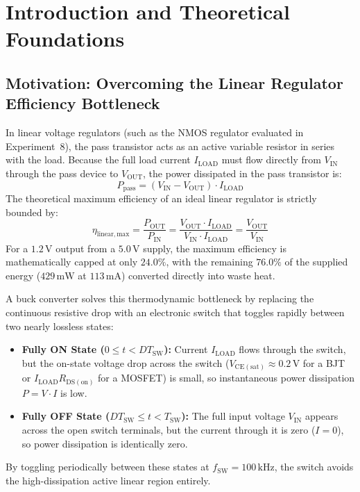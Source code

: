 \documentclass[11pt,a4paper]{article}
\begin{document}
\section{Introduction and Theoretical Foundations}

\subsection{Motivation: Overcoming the Linear Regulator Efficiency Bottleneck}
In linear voltage regulators (such as the NMOS regulator evaluated in Experiment~8), the pass transistor acts as an active variable resistor in series with the load. Because the full load current $I_{\mathrm{LOAD}}$ must flow directly from $V_{\mathrm{IN}}$ through the pass device to $V_{\mathrm{OUT}}$, the power dissipated in the pass transistor is:
\begin{equation}
    P_{\mathrm{pass}} = (V_{\mathrm{IN}} - V_{\mathrm{OUT}}) \cdot I_{\mathrm{LOAD}}
\end{equation}
The theoretical maximum efficiency of an ideal linear regulator is strictly bounded by:
\begin{equation}
    \eta_{\mathrm{linear,max}} = \frac{P_{\mathrm{OUT}}}{P_{\mathrm{IN}}} = \frac{V_{\mathrm{OUT}} \cdot I_{\mathrm{LOAD}}}{V_{\mathrm{IN}} \cdot I_{\mathrm{LOAD}}} = \frac{V_{\mathrm{OUT}}}{V_{\mathrm{IN}}}
\end{equation}
For a $1.2\,\mathrm{V}$ output from a $5.0\,\mathrm{V}$ supply, the maximum efficiency is mathematically capped at only $24.0\%$, with the remaining $76.0\%$ of the supplied energy ($429\,\mathrm{mW}$ at $113\,\mathrm{mA}$) converted directly into waste heat.

A buck converter solves this thermodynamic bottleneck by replacing the continuous resistive drop with an electronic switch that toggles rapidly between two nearly lossless states:
\begin{itemize}
    \item \textbf{Fully ON State ($0 \le t < D T_{\mathrm{SW}}$):} Current $I_{\mathrm{LOAD}}$ flows through the switch, but the on-state voltage drop across the switch ($V_{\mathrm{CE(sat)}} \approx 0.2\,\mathrm{V}$ for a BJT or $I_{\mathrm{LOAD}} R_{\mathrm{DS(on)}}$ for a MOSFET) is small, so instantaneous power dissipation $P = V \cdot I$ is low.
    \item \textbf{Fully OFF State ($D T_{\mathrm{SW}} \le t < T_{\mathrm{SW}}$):} The full input voltage $V_{\mathrm{IN}}$ appears across the open switch terminals, but the current through it is zero ($I = 0$), so power dissipation is identically zero.
\end{itemize}
By toggling periodically between these states at $f_{\mathrm{SW}} = 100\,\mathrm{kHz}$, the switch avoids the high-dissipation active linear region entirely.
\end{document}
